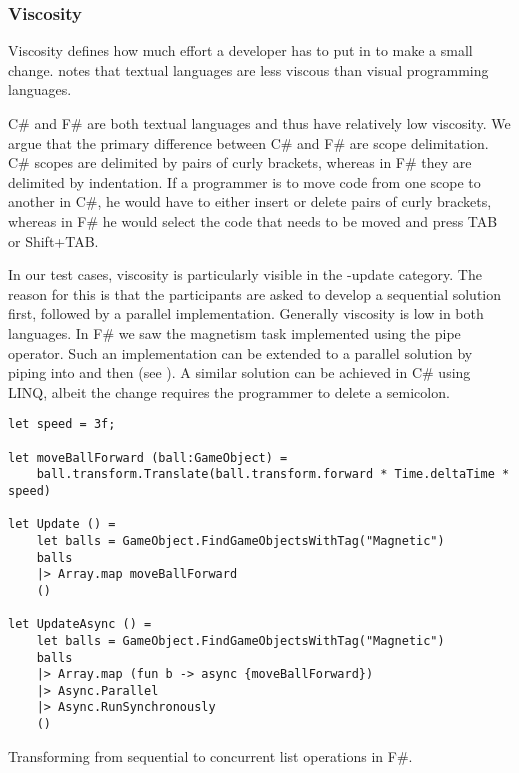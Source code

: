 \subsubsection{Viscosity}
Viscosity defines how much effort a developer has to put in to make a small change. \cite{green1996usability} notes that textual languages are less viscous than visual programming languages.

C\# and F\# are both textual languages and thus have relatively low viscosity. We argue that the primary difference between C\# and F\# are scope delimitation. C\# scopes are delimited by pairs of curly brackets, whereas in F\# they are delimited by indentation. If a programmer is to move code from one scope to another in C\#, he would have to either insert or delete pairs of curly brackets, whereas in F\# he would select the code that needs to be moved and press TAB or Shift+TAB.

In our test cases, viscosity is particularly visible in the -update category. The reason for this is that the participants are asked to develop a sequential solution first, followed by a parallel implementation. Generally viscosity is low in both languages. In F\# we saw the magnetism task implemented using the pipe operator. Such an implementation can be extended to a parallel solution by piping into  and then  (see ). A similar solution can be achieved in C\# using \gls{LINQ}, albeit the change requires the programmer to delete a semicolon.

\begin{listing}
    \begin{verbatim}
let speed = 3f;

let moveBallForward (ball:GameObject) =
    ball.transform.Translate(ball.transform.forward * Time.deltaTime * speed)

let Update () =
    let balls = GameObject.FindGameObjectsWithTag("Magnetic")
    balls
    |> Array.map moveBallForward
    ()

let UpdateAsync () =
    let balls = GameObject.FindGameObjectsWithTag("Magnetic")
    balls
    |> Array.map (fun b -> async {moveBallForward})
    |> Async.Parallel
    |> Async.RunSynchronously
    ()
    \end{verbatim}
    \caption{Transforming from sequential to concurrent list operations in F\#.}
    \label{lst:fsharp:pipe:async}
\end{listing}


